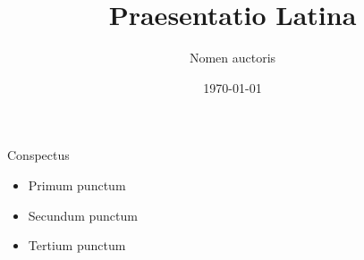 \documentclass{beamer}
\title{Praesentatio Latina}
\author{Nomen auctoris}
\date{\today}
\begin{document}
\begin{frame}
  \titlepage
\end{frame}

\begin{frame}{Conspectus}
  \begin{itemize}
    \item Primum punctum
    \item Secundum punctum
    \item Tertium punctum
  \end{itemize}
\end{frame}
\end{document}
